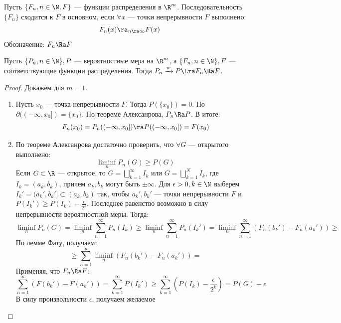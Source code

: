 \begin{definition}
    Пусть \(\{F_n, n \in \N, F\}\) --- функции распределения в \(\R^m\). Последовательность \(\{F_n\}\) сходится к \(F\) в основном, если \(\forall x\) --- точки непрерывности \(F\) выполнено:
    \[F_n(x) \ra_{n \ra \infty} F(x)\]
    Обозначение: \(F_n \Ra F\)
\end{definition}

\begin{theorem}
    Пусть \(\{P_n, n \in \N\}, P\) --- вероятностные мера на \(\R^m\), а \(\{F_n, n \in \N\}, F\) --- соответствующие функции распределения. Тогда \(P_n \xrightarrow{w} P \Lra F_n \Ra F\).
\end{theorem}


\begin{proof}
    Докажем для \(m = 1\). 
    \begin{enumerate}
        \item[\(\Ra\)] Пусть \(x_0\) --- точка непрерывности \(F\). Тогда \(P(\{x_0\}) = 0\). Но \(\partial((-\infty, x_0]) = \{x_0\}\). По теореме Алексанрова, \(P_n \Ra P\). В итоге:
        \[F_n(x_0) = P_n((-\infty, x_0]) \ra P((-\infty, x_0]) = F(x_0)\]
        \item[\(\La\)] По теореме Алексанрова достаточно проверить, что \(\forall G\) --- открытого выполнено:
        \[\liminf_{n} P_n(G) \ge P(G)\]
        Если \(G \subset \R\) --- открытое, то \(G = \bigsqcup_{k = 1}^\infty I_k\) или \(G = \bigsqcup_{k = 1}^N I_k\), где \(I_k = (a_k, b_k)\), причем \(a_k, b_k\) могут быть \(\pm\infty\). Для \(\epsilon > 0, k \in \N\) выберем \(I_k' = (a_k', b_k'] \subset (a_k, b_k)\) так, чтобы \(a_k', b_k'\) --- точки непрерывности \(F\) и \(P(I_k') \ge P(I_k) - \frac{\epsilon}{2^k}\). Последнее равенство возможно в силу непрерывности вероятностной меры. Тогда:
        \[\liminf_n P_n(G) = \liminf_n \sum_{n = 1}^\infty P_n(I_k) \ge \liminf_n \sum_{n = 1}^\infty P_n(I_k') = \liminf_n \sum_{n = 1}^\infty (F_n(b_k') - F_n(a_k')) \ge\]
        По лемме Фату, получаем:
        \[\ge \sum_{n = 1}^\infty \liminf_n (F_n(b_k') - F_n(a_k')) = \]
        Применяя, что \(F_n \Ra F\):
        \[\sum_{n = 1}^\infty (F(b_k') - F(a_k')) = \sum_{k = 1}^\infty P(I_k') \ge \sum_{k = 1}^\infty \left( P(I_k) - \frac{\epsilon}{2^k} \right) = P(G) - \epsilon\]
        В силу произвольности \(\epsilon\), получаем желаемое
    \end{enumerate}
\end{proof}

